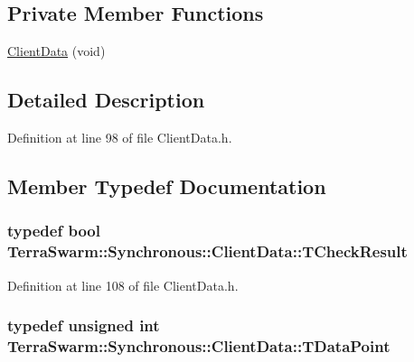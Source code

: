 \subsection*{Private Member Functions}
\begin{DoxyCompactItemize}
\item 
\hyperlink{class_terra_swarm_1_1_synchronous_1_1_client_data_a55b91e768e21a3e176ed03b504182ca3}{Client\-Data} (void)
\end{DoxyCompactItemize}


\subsection{Detailed Description}


Definition at line 98 of file Client\-Data.\-h.



\subsection{Member Typedef Documentation}
\hypertarget{class_terra_swarm_1_1_synchronous_1_1_client_data_a2a4af9153f7e8fe6cadba6a188ce2207}{
\subsubsection[{T\-Check\-Result}]{\setlength{\rightskip}{0pt plus 5cm}typedef bool {\bf Terra\-Swarm\-::\-Synchronous\-::\-Client\-Data\-::\-T\-Check\-Result}}}\label{class_terra_swarm_1_1_synchronous_1_1_client_data_a2a4af9153f7e8fe6cadba6a188ce2207}


Definition at line 108 of file Client\-Data.\-h.

\hypertarget{class_terra_swarm_1_1_synchronous_1_1_client_data_a6c581f1f80217390ea8fe95136c60f07}{
\subsubsection[{T\-Data\-Point}]{\setlength{\rightskip}{0pt plus 5cm}typedef unsigned int {\bf Terra\-Swarm\-::\-Synchronous\-::\-Client\-Data\-::\-T\-Data\-Point}}}\label{class_terra_swarm_1_1_synchronous_1_1_client_data_a6c581f1f80217390ea8fe95136c60f07}


